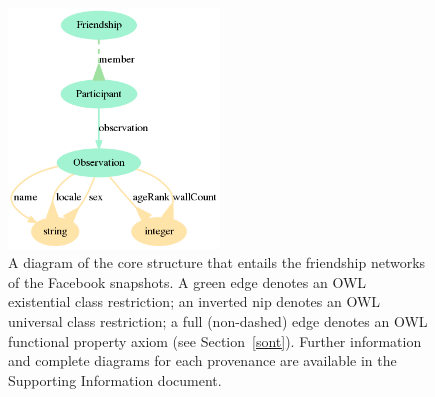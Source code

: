 \documentclass[review]{elsarticle}
\begin{document}
\begin{figure}[!ht]
    \centering
    \includegraphics[width=0.5\textwidth]{ontologies/facebook-legacy-AntonioAnzoategui18022013Friendship.ttl/draw}
    \caption{A diagram of the core structure that entails the friendship networks
    of the Facebook snapshots. A green edge denotes an OWL existential class restriction; an inverted nip denotes an OWL universal class restriction; a full (non-dashed) edge denotes an OWL functional property axiom (see Section~\ref{sont}). Further information and complete diagrams for each provenance are available in the Supporting Information document.}\label{dia}
\end{figure}
\end{document}
